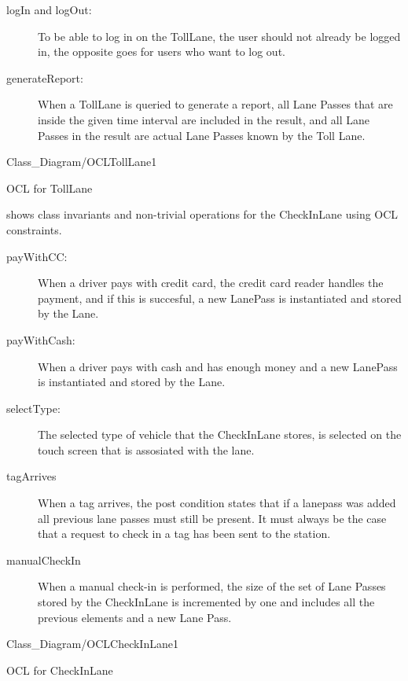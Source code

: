 \begin{description}
\item [logIn and logOut:] To be able to log in on the TollLane, the user should not already be logged in, the opposite goes for users who want to log out.
\item [generateReport:] When a TollLane is queried to generate a report, all Lane Passes that are inside the given time interval are included in the result, and all Lane Passes in the result are actual Lane Passes known by the Toll Lane.
\end{description}


\begin{myfigure}{Class_Diagram/OCLTollLane}{1}
\caption{OCL for TollLane\madeby{\af}{\kj}}
\label{fig:OCLTollLane}
\end{myfigure}



 shows class invariants and non-trivial operations for the CheckInLane using OCL constraints.

\begin{description}
\item [payWithCC:]When a driver pays with credit card, the credit card reader handles the payment, and if this is succesful, a new LanePass is instantiated and stored by the Lane.

\item [payWithCash:]When a driver pays with cash and has enough money and a new LanePass is instantiated and stored by the Lane.

\item [selectType:]The selected type of vehicle that the CheckInLane stores, is selected on the touch screen that is assosiated with the lane.

\item [tagArrives]When a tag arrives, the post condition states that if a lanepass was added all previous lane passes must still be present. It must always be the case that a request to check in a tag has been sent to the station.

\item [manualCheckIn]When a manual check-in is performed, the size of the set of Lane Passes stored by the CheckInLane is incremented by one and includes all the previous elements and a new Lane Pass.
\end{description}

\begin{myfigure}{Class_Diagram/OCLCheckInLane}{1}
\caption{OCL for CheckInLane \madeby{\jb}{\mt}}
\label{fig:OCLCheckInLane}
\end{myfigure}

